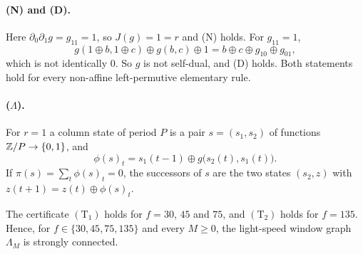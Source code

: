 \paragraph{\textup{(N)} and \textup{(D)}.} Here $\partial_0\partial_1g=g_{11}=1$, so $J(g)=1=r$ and \textup{(N)} holds. For $g_{11}=1$,
\[
g(1\oplus b,1\oplus c)\oplus g(b,c)\oplus1=b\oplus c\oplus g_{10}\oplus g_{01},
\]
which is not identically $0$. So $g$ is not self-dual, and \textup{(D)} holds. Both statements hold for every non-affine left-permutive elementary rule.

\paragraph{\textup{($\Lambda$)}.} For $r=1$ a column state of period $P$ is a pair $s=(s_1,s_2)$ of functions $\mathbb{Z}/P\to\{0,1\}$, and
\[
\phi(s)_t=s_1(t-1)\oplus g\bigl(s_2(t),s_1(t)\bigr).
\]
If $\pi(s)=\sum_t\phi(s)_t=0$, the successors of $s$ are the two states $(s_2,z)$ with $z(t+1)=z(t)\oplus\phi(s)_t$.

\begin{proposition}\label{pm:prop:window}
The certificate $(\mathrm T_1)$ holds for $f=30$, $45$ and $75$, and $(\mathrm T_2)$ holds for $f=135$. Hence, for $f\in\{30,45,75,135\}$ and every $M\ge0$, the light-speed window graph $\Lambda_M$ is strongly connected.
\end{proposition}


